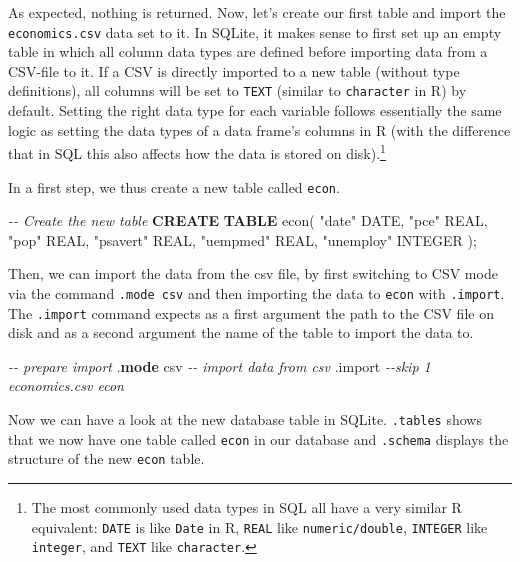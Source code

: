 \documentclass[
  12pt,
]{style/krantz}
\newenvironment{Shaded}{\begin{snugshade}}{\end{snugshade}}
\newcommand{\CommentTok}[1]{\textcolor[rgb]{0.56,0.35,0.01}{\textit{#1}}}
\newcommand{\DataTypeTok}[1]{\textcolor[rgb]{0.13,0.29,0.53}{#1}}
\newcommand{\KeywordTok}[1]{\textcolor[rgb]{0.13,0.29,0.53}{\textbf{#1}}}
\newcommand{\NormalTok}[1]{#1}
\newcommand{\OtherTok}[1]{\textcolor[rgb]{0.56,0.35,0.01}{#1}}
\begin{document}
As expected, nothing is returned. Now, let's create our first table and import the \texttt{economics.csv} data set to it. In SQLite, it makes sense to first set up an empty table in which all column data types are defined before importing data from a CSV-file to it. If a CSV is directly imported to a new table (without type definitions), all columns will be set to \texttt{TEXT} (similar to \texttt{character} in R) by default. Setting the right data type for each variable follows essentially the same logic as setting the data types of a data frame's columns in R (with the difference that in SQL this also affects how the data is stored on disk).\footnote{The most commonly used data types in SQL all have a very similar R equivalent: \texttt{DATE} is like \texttt{Date} in R, \texttt{REAL} like \texttt{numeric/double}, \texttt{INTEGER} like \texttt{integer}, and \texttt{TEXT} like \texttt{character}.}

In a first step, we thus create a new table called \texttt{econ}.

\begin{Shaded}
\begin{Highlighting}[]
\CommentTok{{-}{-} Create the new table}
\KeywordTok{CREATE} \KeywordTok{TABLE}\NormalTok{ econ(}
\OtherTok{"date"} \DataTypeTok{DATE}\NormalTok{,}
\OtherTok{"pce"} \DataTypeTok{REAL}\NormalTok{,}
\OtherTok{"pop"} \DataTypeTok{REAL}\NormalTok{,}
\OtherTok{"psavert"} \DataTypeTok{REAL}\NormalTok{,}
\OtherTok{"uempmed"} \DataTypeTok{REAL}\NormalTok{,}
\OtherTok{"unemploy"} \DataTypeTok{INTEGER}
\NormalTok{);}
\end{Highlighting}
\end{Shaded}

Then, we can import the data from the csv file, by first switching to CSV mode via the command \texttt{.mode\ csv} and then importing the data to \texttt{econ} with \texttt{.import}. The \texttt{.import} command expects as a first argument the path to the CSV file on disk and as a second argument the name of the table to import the data to.

\begin{Shaded}
\begin{Highlighting}[]
\CommentTok{{-}{-} prepare import}
\NormalTok{.}\KeywordTok{mode}\NormalTok{ csv}
\CommentTok{{-}{-} import data from csv}
\NormalTok{.import }\CommentTok{{-}{-}skip 1 economics.csv econ}
\end{Highlighting}
\end{Shaded}

Now we can have a look at the new database table in SQLite. \texttt{.tables} shows that we now have one table called \texttt{econ} in our database and \texttt{.schema} displays the structure of the new \texttt{econ} table.
\end{document}
